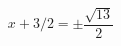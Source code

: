 \documentclass[preview]{standalone}
\begin{document}
\begin{align*}
x + 3 / 2 = \pm \dfrac{\sqrt{13} }{2}
\end{align*}
\end{document}
